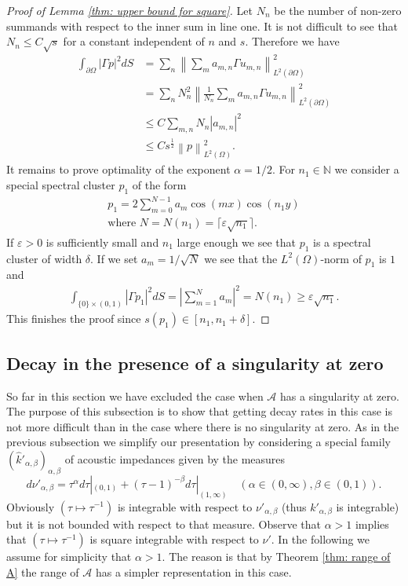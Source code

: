 \documentclass{amsart}
\newcommand{\abs}[1]{\left|#1\right|}
\newcommand{\norm}[1]{\left\| #1 \right\|}
\newcommand{\A}{\mathcal{A}}
\newcommand{\khat}{\hat{k}}
\newcommand{\N}{\mathbb{N}}
\begin{document}
\begin{proof}[Proof of Lemma \ref{thm: upper bound for square}]
Let $N_n$ be the number of non-zero summands with respect to the inner sum in line one. It is not difficult to see that $N_n\leq C \sqrt{s}$ for a constant independent of $n$ and $s$. Therefore we have
 \begin{align*}
  \int_{\partial\Omega} |\Gamma p|^2 dS  &= \sum_n \norm{\sum_m a_{m,n} \Gamma u_{m,n}}_{L^2(\partial\Omega)}^2 \\
  &= \sum_n N_n^2 \norm{\frac{1}{N_n}\sum_m a_{m,n} \Gamma u_{m,n}}_{L^2(\partial\Omega)}^2 \\
  &\leq C \sum_{m,n} N_n \abs{a_{m,n}}^2 \\
  &\leq C s^{\frac{1}{2}} \norm{p}_{L^2(\Omega)}^2 .
 \end{align*}
 It remains to prove optimality of the exponent $\alpha=1/2$. For $n_1\in\N$ we consider a special spectral cluster $p_1$ of the form
 \begin{align*}
  p_1 = 2 \sum_{m=0}^{N-1} a_m \cos(m x)\cos(n_1 y) \\
  \text{where } N=N(n_1) = \lceil\varepsilon \sqrt{n_1}\rceil.
 \end{align*}
 If $\varepsilon>0$ is sufficiently small and $n_1$ large enough we see that $p_1$ is a spectral cluster of width $\delta$. If we set $a_m=1/\sqrt{N}$ we see that the $L^2(\Omega)$-norm of $p_1$ is $1$ and 
 \begin{align*}
  \int_{\{0\}\times (0,1)} \abs{\Gamma p_1}^2 dS = \abs{\sum_{m=1}^{N} a_m}^2 = N(n_1) \geq \varepsilon\sqrt{n_1} .
 \end{align*}
 This finishes the proof since $s(p_1)\in [n_1, n_1+\delta]$.
\end{proof}

\subsection{Decay in the presence of a singularity at zero}\label{sec: Example singularity at 0}
So far in this section we have excluded the case when $\A$ has a singularity at zero. The purpose of this subsection is to show that getting decay rates in this case is not more difficult than in the case where there is no singularity at zero. As in the previous subsection we simplify our presentation by considering a special family $(\khat'_{\alpha,\beta})_{\alpha,\beta}$ of acoustic impedances given by the measures
\begin{equation}\nonumber
   d\nu'_{\alpha,\beta} = \tau^{\alpha} d\tau|_{(0,1)} + (\tau-1)^{-\beta} d\tau|_{(1,\infty)} \quad (\alpha\in(0,\infty),\beta\in(0,1)).
  \end{equation}
  Obviously $(\tau\mapsto\tau^{-1})$ is integrable with respect to $\nu'_{\alpha,\beta}$ (thus $k'_{\alpha,\beta}$ is integrable) but it is not bounded with respect to that measure. Observe that $\alpha>1$ implies that $(\tau\mapsto\tau^{-1})$ is square integrable with respect to $\nu'$. In the following we assume for simplicity that $\alpha>1$. The reason is that by Theorem \ref{thm: range of A} the range of $\A$ has a simpler representation in this case.
\end{document}
